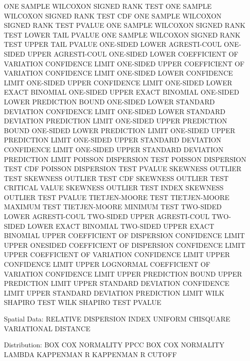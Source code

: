    ONE SAMPLE WILCOXON SIGNED RANK TEST
   ONE SAMPLE WILCOXON SIGNED RANK TEST CDF
   ONE SAMPLE WILCOXON SIGNED RANK TEST PVALUE
   ONE SAMPLE WILCOXON SIGNED RANK TEST LOWER TAIL PVALUE
   ONE SAMPLE WILCOXON SIGNED RANK TEST UPPER TAIL PVALUE
   ONE-SIDED LOWER AGRESTI-COUL
   ONE-SIDED UPPER AGRESTI-COUL
   ONE-SIDED LOWER COEFFICIENT OF VARIATION CONFIDENCE LIMIT
   ONE-SIDED UPPER COEFFICIENT OF VARIATION CONFIDENCE LIMIT
   ONE-SIDED LOWER CONFIDENCE LIMIT
   ONE-SIDED UPPER CONFIDENCE LIMIT
   ONE-SIDED LOWER EXACT BINOMIAL
   ONE-SIDED UPPER EXACT BINOMIAL
   ONE-SIDED LOWER PREDICTION BOUND
   ONE-SIDED LOWER STANDARD DEVIATION CONFIDENCE LIMIT
   ONE-SIDED LOWER STANDARD DEVIATION PREDICTION LIMIT
   ONE-SIDED UPPER PREDICTION BOUND
   ONE-SIDED LOWER PREDICTION LIMIT
   ONE-SIDED UPPER PREDICTION LIMIT
   ONE-SIDED UPPER STANDARD DEVIATION CONFIDENCE LIMIT
   ONE-SIDED UPPER STANDARD DEVIATION PREDICTION LIMIT
   POISSON DISPERSION TEST
   POISSON DISPERSION TEST CDF
   POISSON DISPERSION TEST PVALUE
   SKEWNESS OUTLIER TEST
   SKEWNESS OUTLIER TEST CDF
   SKEWNESS OUTLIER TEST CRITICAL VALUE
   SKEWNESS OUTLIER TEST INDEX
   SKEWNESS OUTLIER TEST PVALUE
   TIETJEN-MOORE TEST
   TIETJEN-MOORE MAXIMUM TEST
   TIETJEN-MOORE MINIMUM TEST
   TWO-SIDED LOWER AGRESTI-COUL
   TWO-SIDED UPPER AGRESTI-COUL
   TWO-SIDED LOWER EXACT BINOMIAL
   TWO-SIDED UPPER EXACT BINOMIAL
   UPPER COEFFICIENT OF DISPERSION CONFIDENCE LIMIT
   UPPER ONESIDED COEFFICIENT OF DISPERSION CONFIDENCE LIMIT
   UPPER COEFFICIENT OF VARIATION CONFIDENCE LIMIT
   UPPER CONFIDENCE LIMIT
   UPPER LOGNORMAL COEFFICIENT OF VARIATION CONFIDENCE LIMIT
   UPPER PREDICTION BOUND
   UPPER PREDICTION LIMIT
   UPPER STANDARD DEVIATION CONFIDENCE LIMIT
   UPPER STANDARD DEVIATION PREDICTION LIMIT
   WILK SHAPIRO TEST
   WILK SHAPIRO TEST PVALUE

Spatial Data:
   RELATIVE DISPERSION INDEX
   UNIFORM CHISQUARE
   VARIATIONAL DISTANCE

Distribution:
   BOX COX NORMALITY PPCC
   BOX COX NORMALITY LAMBDA
   KAPPENMAN R
   KAPPENMAN R CUTOFF

